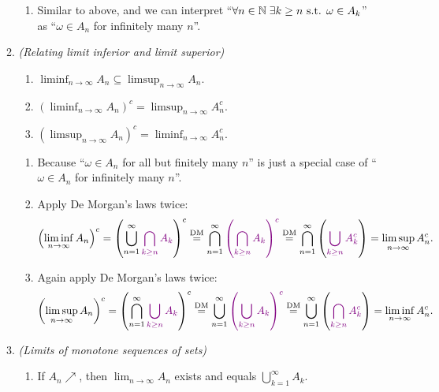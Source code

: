 \begin{enumerate}
\begin{enumerate}
\begin{pf}
\begin{enumerate}
\item Similar to above, and we can interpret ``\(\forall n\in\mathbb{N}\; \exists k\ge
n\text{ s.t. }\omega\in A_k\)'' as ``\(\omega\in A_n\) for infinitely many \(n\)''.
\end{enumerate}
\end{pf}
\item \label{it:liminfsup-relate} \emph{(Relating limit inferior and limit superior)}
\begin{enumerate}
\item \(\liminf_{n\to \infty}A_n\subseteq \limsup_{n\to \infty}A_n \).
\item \((\liminf_{n\to \infty}A_n)^{c}=\limsup_{n\to \infty}A_n^c \).
\item \((\limsup_{n\to \infty}A_n)^{c}=\liminf_{n\to \infty}A_n^c \).
\end{enumerate}
\begin{pf}
\begin{enumerate}
\item Because ``\(\omega\in A_n\) for all but finitely many \(n\)'' is just a
special case of ``\(\omega\in A_n\) for infinitely many \(n\)''.
\item Apply De Morgan's laws twice:
\[
\left(\liminf_{n\to \infty}A_n\right)^{c}
=\left(\bigcup_{n=1}^{\infty}{\color{violet}\bigcap_{k\ge n}A_k}\right)^{c}
\overset{\text{DM}}{=} \bigcap_{n=1}^{\infty}{\color{violet}\left(\bigcap_{k\ge n}A_k\right)^{c}}
\overset{\text{DM}}{=} \bigcap_{n=1}^{\infty}\left({\color{violet}\bigcup_{k\ge n}A_k^{c}}\right)
=\limsup_{n\to \infty}A_n^c .
\]
\item Again apply De Morgan's laws twice:
\[
\left(\limsup_{n\to \infty}A_n\right)^{c}
=\left(\bigcap_{n=1}^{\infty}{\color{violet}\bigcup_{k\ge n}A_k}\right)^{c}
\overset{\text{DM}}{=} \bigcup_{n=1}^{\infty}{\color{violet}\left(\bigcup_{k\ge n}A_k\right)^{c}}
\overset{\text{DM}}{=} \bigcup_{n=1}^{\infty}\left({\color{violet}\bigcap_{k\ge n}A_k^{c}}\right)
=\liminf_{n\to \infty}A_n^c .
\]
\end{enumerate}
\end{pf}
\item \label{it:lim-mono-sets} \emph{(Limits of monotone sequences of sets)}
\begin{enumerate}
\item If \(A_n\nearrow\), then \(\lim_{n\to \infty}A_n\) exists and equals \(\bigcup_{k=1}^{\infty} A_k\).


\end{enumerate}
\end{enumerate}
\end{enumerate}
